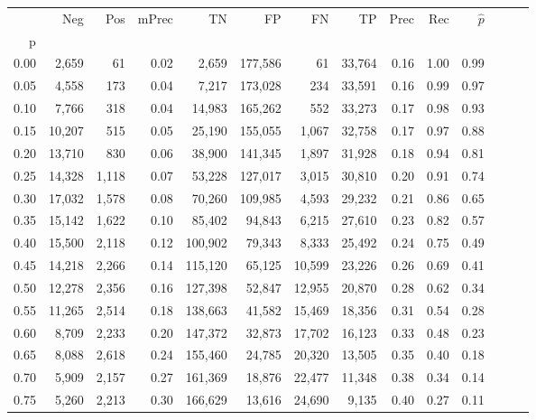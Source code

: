 \begin{tabular}{rrrrrrrrrrrrrr}
\toprule
{} &     Neg &    Pos & mPrec &       TN &       FP &      FN &      TP &  Prec &   Rec & $\hat{p}$ \\
p    &         &        &       &          &          &         &         &       &       &           \\
\midrule
0.00 &   2,659 &     61 &  0.02 &    2,659 &  177,586 &      61 &  33,764 &  0.16 &  1.00 &      0.99 \\
0.05 &   4,558 &    173 &  0.04 &    7,217 &  173,028 &     234 &  33,591 &  0.16 &  0.99 &      0.97 \\
0.10 &   7,766 &    318 &  0.04 &   14,983 &  165,262 &     552 &  33,273 &  0.17 &  0.98 &      0.93 \\
0.15 &  10,207 &    515 &  0.05 &   25,190 &  155,055 &   1,067 &  32,758 &  0.17 &  0.97 &      0.88 \\
0.20 &  13,710 &    830 &  0.06 &   38,900 &  141,345 &   1,897 &  31,928 &  0.18 &  0.94 &      0.81 \\
0.25 &  14,328 &  1,118 &  0.07 &   53,228 &  127,017 &   3,015 &  30,810 &  0.20 &  0.91 &      0.74 \\
0.30 &  17,032 &  1,578 &  0.08 &   70,260 &  109,985 &   4,593 &  29,232 &  0.21 &  0.86 &      0.65 \\
0.35 &  15,142 &  1,622 &  0.10 &   85,402 &   94,843 &   6,215 &  27,610 &  0.23 &  0.82 &      0.57 \\
0.40 &  15,500 &  2,118 &  0.12 &  100,902 &   79,343 &   8,333 &  25,492 &  0.24 &  0.75 &      0.49 \\
0.45 &  14,218 &  2,266 &  0.14 &  115,120 &   65,125 &  10,599 &  23,226 &  0.26 &  0.69 &      0.41 \\
0.50 &  12,278 &  2,356 &  0.16 &  127,398 &   52,847 &  12,955 &  20,870 &  0.28 &  0.62 &      0.34 \\
0.55 &  11,265 &  2,514 &  0.18 &  138,663 &   41,582 &  15,469 &  18,356 &  0.31 &  0.54 &      0.28 \\
0.60 &   8,709 &  2,233 &  0.20 &  147,372 &   32,873 &  17,702 &  16,123 &  0.33 &  0.48 &      0.23 \\
0.65 &   8,088 &  2,618 &  0.24 &  155,460 &   24,785 &  20,320 &  13,505 &  0.35 &  0.40 &      0.18 \\
0.70 &   5,909 &  2,157 &  0.27 &  161,369 &   18,876 &  22,477 &  11,348 &  0.38 &  0.34 &      0.14 \\
0.75 &   5,260 &  2,213 &  0.30 &  166,629 &   13,616 &  24,690 &   9,135 &  0.40 &  0.27 &      0.11 \\

\end{tabular}
